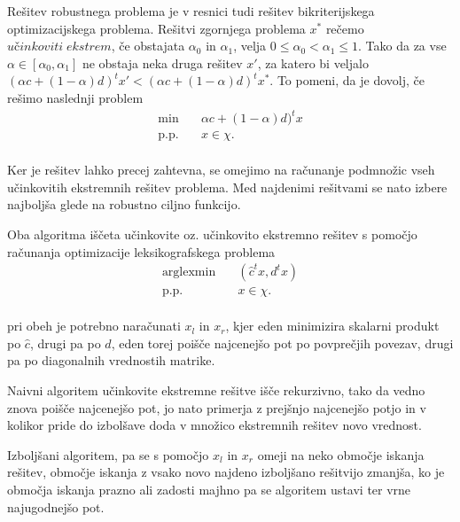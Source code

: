 \documentclass[a4paper, 12 pt]{article}
\theoremstyle{definition} %
\theoremstyle{plain} %
\theoremstyle{definition}
\begin{document}
Rešitev robustnega problema je v resnici tudi rešitev bikriterijskega optimizacijskega problema. Rešitvi zgornjega problema $x^*$ rečemo $učinkoviti\;ekstrem$, če obstajata  $\alpha_{0}$ in $\alpha_{1}$, velja $0 \le \alpha_{0} < \alpha_{1} \le 1$. Tako da za vse $\alpha \in [\alpha_{0},\alpha_{1}]$  ne obstaja neka druga rešitev $x'$, za katero bi veljalo $(\alpha c + (1 - \alpha)d)^tx' < (\alpha c + (1- \alpha)d)^tx^{*}$.\newline
 To pomeni, da je dovolj, če rešimo naslednji problem
\begin{equation*}
\begin{aligned}
\min \quad &  \alpha c + (1 - \alpha)d)^tx \\
\textrm{p.p.} \quad & x \in \chi.\\
\end{aligned}
\end{equation*}

Ker je rešitev lahko precej zahtevna, se omejimo na računanje podmnožic vseh učinkovitih ekstremnih rešitev problema. Med najdenimi rešitvami se nato izbere najboljša glede na robustno ciljno funkcijo.\newline


Oba algoritma iščeta učinkovite oz. učinkovito ekstremno rešitev s pomočjo računanja optimizacije leksikografskega problema
\begin{equation*}
\begin{aligned}
\text{arglexmin}\quad &  (\hat{c}^t x , {d^tx})\\
\textrm{p.p.} \quad & x \in \chi.\\
\end{aligned}
\end{equation*}

pri obeh je potrebno naračunati $x_l$ in $x_r$, kjer eden minimizira skalarni produkt po $\hat{c}$, drugi pa po $d$, eden torej poišče najcenejšo pot po povprečjih povezav, drugi pa po diagonalnih vrednostih matrike.\newline

Naivni algoritem učinkovite ekstremne rešitve išče rekurzivno, tako da vedno znova poišče najcenejšo pot, jo nato primerja z prejšnjo najcenejšo potjo in v kolikor pride do izbolšave doda v množico ekstremnih rešitev novo vrednost.

Izboljšani algoritem, pa se s pomočjo $x_l$ in $x_r$ omeji na neko območje iskanja rešitev, območje iskanja z vsako novo najdeno izboljšano rešitvijo zmanjša, ko je območja iskanja prazno ali zadosti majhno pa se algoritem ustavi ter vrne najugodnejšo pot.
\end{document}
